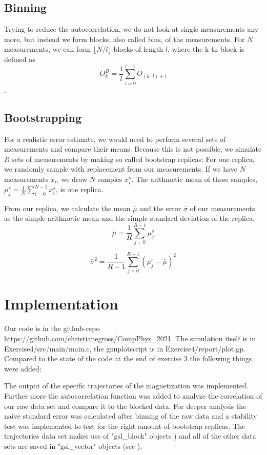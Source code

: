 \documentclass{scrartcl}
\begin{document}
\subsection{Binning}

Trying to reduce the autocorrelation, we do not look at single measurements any more, but instead we form blocks, also called bins, of the measurements. For $N$ measurements, we can form $\lfloor N/l \rfloor$ blocks of length $l$, where the k-th block is defined as \[O_k^B=\frac{1}{l}\sum_{i=0}^{l-1}O_{(k\cdot l)+i}\].

\subsection{Bootstrapping}


For a realistic error estimate, we would need to perform several sets of measurements and compare their means. Because this is not possible, we simulate $R$ sets of measurements by making so called bootstrap replicas: For one replica, we randomly sample with replacement from our measurements. If we have $N$ measurements $x_i$, we draw $N$ samples $x_i^s$. The arithmetic mean of these samples, $\mu^s_j=\frac{1}{N}\sum_{i=0}^{N-1}x_i^s$, is one replica.

From our replica, we calculate the mean $\bar{\mu}$ and the error $\bar{\sigma}$ of our measurements as the simple arithmetic mean and the simple standard deviation of the replica.
\[
\bar{\mu}=\frac{1}{R}\sum_{j=0}^{R-1}\mu^s_j\]


\[
\bar{\sigma}^2=\frac{1}{R-1}\sum_{j=0}^{R-1}(\mu^s_j-\bar{\mu})^2
\]

\section{Implementation}
Our code is in the github-repo \url{https://github.com/christianegross/CompPhys\_2021}. The simulation itself is in Exercise4/src/main/main.c, the gnuplotscript is in Exercise4/report/plot.gp. Compared to the state of the code at the end of exercise 3 the following things were added:

The output of the specific trajectories of the magnetization was implemented. Further more the autocorrelation function was added to analyze the correlation of our raw data set and compare it to the blocked data. For deeper analysis the naive standard error was calculated after binning of the raw data and a stability test was implemented to test for the right amount of bootstrap replicas. The trajectories data set makes use of "gsl\_block" objects \cite{gsldoc_blk}) and all of the other data sets are saved in "gsl\_vector" objects (see \cite{gsldoc_mat}).
\end{document}
